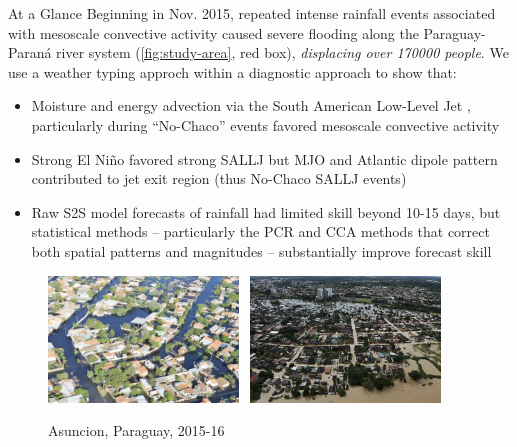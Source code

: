 \begin{block}{At a Glance}
  Beginning in Nov. 2015, repeated intense rainfall events associated with mesoscale convective activity caused severe flooding along the Paraguay-Paran\'{a} river system (\cref{fig:study-area}, red box), \emph{displacing over 170000 people}.
  We use a weather typing approch within a diagnostic approach to show that:
  \begin{itemize}
    \item Moisture and energy advection via the South American Low-Level Jet \cite{Marengo:2012cm}, particularly during ``No-Chaco'' events \cite{Vera:2006ib} favored mesoscale convective activity
    \item Strong El Ni\~{n}o favored strong SALLJ but MJO and Atlantic dipole pattern contributed to jet exit region (thus No-Chaco SALLJ events)
    \item Raw S2S model forecasts of rainfall had limited skill beyond 10-15 days, but statistical methods -- particularly the PCR and CCA methods that correct both spatial patterns and magnitudes -- substantially improve forecast skill
  \end{itemize}
  \begin{mdframed}
  \begin{figure}
  	\noindent\includegraphics[width=0.45\textwidth]{asuncion-inundaciones.jpg}~
    \noindent\includegraphics[width=0.45\textwidth]{rio-py-banados.jpg}
  	\caption{
  		Asuncion, Paraguay, 2015-16
  	}
    \label{fig:floods}
  \end{figure}
  \end{mdframed}
\end{block}

